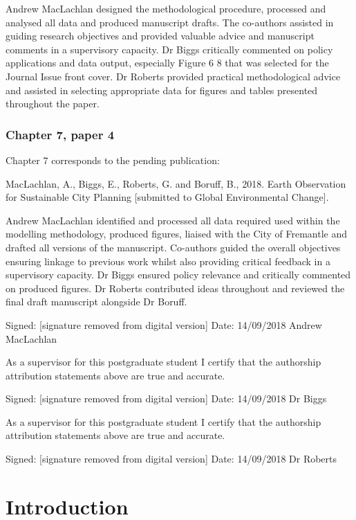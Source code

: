 \documentclass[]{book}
\begin{document}
Andrew MacLachlan designed the methodological procedure, processed and
analysed all data and produced manuscript drafts. The co-authors
assisted in guiding research objectives and provided valuable advice and
manuscript comments in a supervisory capacity. Dr Biggs critically
commented on policy applications and data output, especially Figure 6 8
that was selected for the Journal Issue front cover. Dr Roberts provided
practical methodological advice and assisted in selecting appropriate
data for figures and tables presented throughout the paper.

\subsection*{Chapter 7, paper 4}\label{chapter-7-paper-4}

Chapter 7 corresponds to the pending publication:

MacLachlan, A., Biggs, E., Roberts, G. and Boruff, B., 2018. Earth
Observation for Sustainable City Planning {[}submitted to Global
Environmental Change{]}.

Andrew MacLachlan identified and processed all data required used within
the modelling methodology, produced figures, liaised with the City of
Fremantle and drafted all versions of the manuscript. Co-authors guided
the overall objectives ensuring linkage to previous work whilst also
providing critical feedback in a supervisory capacity. Dr Biggs ensured
policy relevance and critically commented on produced figures. Dr
Roberts contributed ideas throughout and reviewed the final draft
manuscript alongside Dr Boruff.

Signed: {[}signature removed from digital version{]} Date: 14/09/2018
Andrew MacLachlan

As a supervisor for this postgraduate student I certify that the
authorship attribution statements above are true and accurate.

Signed: {[}signature removed from digital version{]} Date: 14/09/2018 Dr
Biggs

As a supervisor for this postgraduate student I certify that the
authorship attribution statements above are true and accurate.

Signed: {[}signature removed from digital version{]} Date: 14/09/2018 Dr
Roberts

\chapter{Introduction}\label{introduction}
\end{document}
